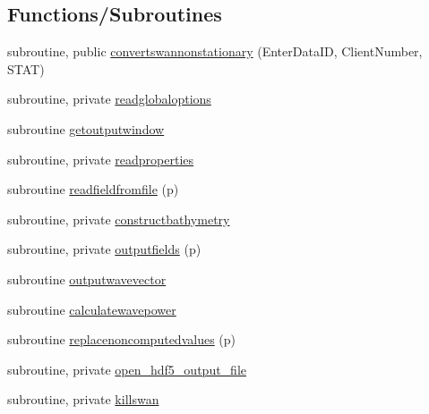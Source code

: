 \subsection*{Functions/\+Subroutines}
\begin{DoxyCompactItemize}
\item 
subroutine, public \mbox{\hyperlink{namespacemodulereadswannonstationary_adb8e6556bbf5f51e70fbc7c10af87a70}{convertswannonstationary}} (Enter\+Data\+ID, Client\+Number, S\+T\+AT)
\item 
subroutine, private \mbox{\hyperlink{namespacemodulereadswannonstationary_a3ca3fa603083a13bf688eeba197ef307}{readglobaloptions}}
\item 
subroutine \mbox{\hyperlink{namespacemodulereadswannonstationary_a7fdb18d8cbff6e60af51a911dbea6813}{getoutputwindow}}
\item 
subroutine, private \mbox{\hyperlink{namespacemodulereadswannonstationary_a2326a23b25b70dbf6d20a3f4395d864e}{readproperties}}
\item 
subroutine \mbox{\hyperlink{namespacemodulereadswannonstationary_ab9855fa733bd4b591442908062b5e2cd}{readfieldfromfile}} (p)
\item 
subroutine, private \mbox{\hyperlink{namespacemodulereadswannonstationary_a75a35cae0f8c8f39af652fdec1a65e65}{constructbathymetry}}
\item 
subroutine, private \mbox{\hyperlink{namespacemodulereadswannonstationary_a0dbbbf2bfd33dfe83b35c14911f575dc}{outputfields}} (p)
\item 
subroutine \mbox{\hyperlink{namespacemodulereadswannonstationary_a9381741247025c8f7b4fd4b06c7b9815}{outputwavevector}}
\item 
subroutine \mbox{\hyperlink{namespacemodulereadswannonstationary_a8c548e44bcbe106ea2fb8ef9f9aae7a1}{calculatewavepower}}
\item 
subroutine \mbox{\hyperlink{namespacemodulereadswannonstationary_a209b3d9c5ca27190c2be35a7d9bb9bce}{replacenoncomputedvalues}} (p)
\item 
subroutine, private \mbox{\hyperlink{namespacemodulereadswannonstationary_adfb4e0c4deb8bcba31fe72f185128ace}{open\+\_\+hdf5\+\_\+output\+\_\+file}}
\item 
subroutine, private \mbox{\hyperlink{namespacemodulereadswannonstationary_a568ac2906250752e8eb67fb713cc4212}{killswan}}
\end{DoxyCompactItemize}
